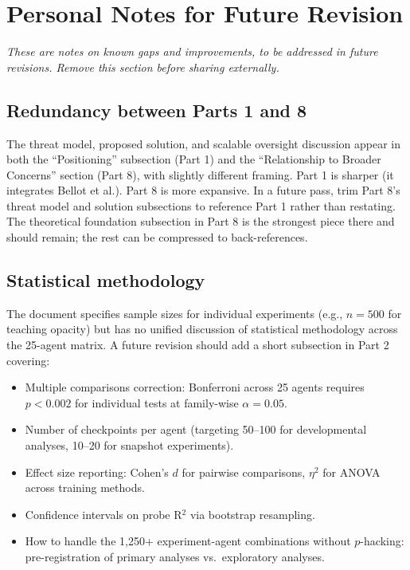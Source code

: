 \documentclass[11pt,a4paper]{article}
\theoremstyle{remark}
\begin{document}

\newpage
\section*{Personal Notes for Future Revision}

\textit{These are notes on known gaps and improvements, to be addressed in future revisions. Remove this section before sharing externally.}

\subsection*{Redundancy between Parts 1 and 8}
The threat model, proposed solution, and scalable oversight discussion appear in both the ``Positioning'' subsection (Part 1) and the ``Relationship to Broader Concerns'' section (Part 8), with slightly different framing. Part 1 is sharper (it integrates Bellot et al.). Part 8 is more expansive. In a future pass, trim Part 8's threat model and solution subsections to reference Part 1 rather than restating. The theoretical foundation subsection in Part 8 is the strongest piece there and should remain; the rest can be compressed to back-references.

\subsection*{Statistical methodology}
The document specifies sample sizes for individual experiments (e.g., $n=500$ for teaching opacity) but has no unified discussion of statistical methodology across the 25-agent matrix. A future revision should add a short subsection in Part 2 covering:
\begin{itemize}[nosep]
    \item Multiple comparisons correction: Bonferroni across 25 agents requires $p < 0.002$ for individual tests at family-wise $\alpha = 0.05$.
    \item Number of checkpoints per agent (targeting 50--100 for developmental analyses, 10--20 for snapshot experiments).
    \item Effect size reporting: Cohen's $d$ for pairwise comparisons, $\eta^2$ for ANOVA across training methods.
    \item Confidence intervals on probe R$^2$ via bootstrap resampling.
    \item How to handle the 1,250+ experiment-agent combinations without $p$-hacking: pre-registration of primary analyses vs.\ exploratory analyses.
\end{itemize}
\end{document}
